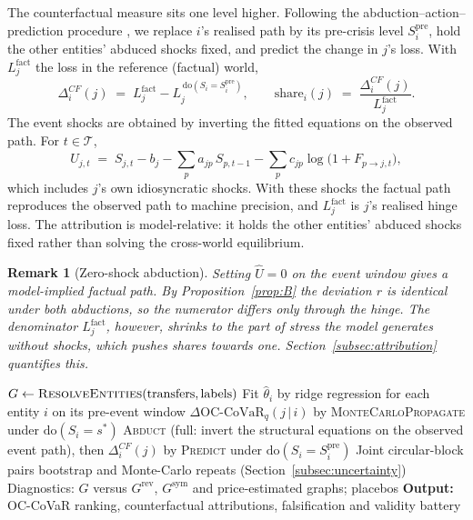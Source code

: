 \documentclass[referee,pdflatex,sn-mathphys-ay]{sn-jnl}
\theoremstyle{thmstyleone}%
\theoremstyle{thmstyletwo}%
\newtheorem{remark}{Remark}%
\theoremstyle{thmstylethree}%
\newcommand{\doop}{\mathrm{do}}
\newcommand{\OCCoVaR}{\text{OC-CoVaR}}
\begin{document}
The counterfactual measure sits one level higher. Following the abduction--action--prediction
procedure \citep{pearl2009causality,pearl2019seven}, we replace $i$'s realised path by its
pre-crisis level $S_i^{\mathrm{pre}}$, hold the other entities' abduced shocks fixed, and
predict the change in $j$'s loss. With $L_j^{\mathrm{fact}}$ the loss in the reference
(factual) world,
\begin{equation}
\label{eq:cf}
\Delta_i^{CF}(j) \;=\; L_j^{\mathrm{fact}} - L_j^{\,\doop(S_i=S_i^{\text{pre}})},
\qquad
\text{share}_i(j) \;=\; \frac{\Delta_i^{CF}(j)}{L_j^{\mathrm{fact}}}.
\end{equation}
The event shocks are obtained by inverting the fitted equations on the observed path. For
$t\in\mathcal{T}$,
\begin{equation}
\label{eq:abduct}
\hat U_{j,t} \;=\; S_{j,t}-b_j-\sum_{p} a_{jp}\,S_{p,t-1}-\sum_{p} c_{jp}\log\!\big(1+F_{p\to j,t}\big),
\end{equation}
which includes $j$'s own idiosyncratic shocks. With these shocks the factual path reproduces the
observed path to machine precision, and $L_j^{\mathrm{fact}}$ is $j$'s realised hinge loss.
The attribution is model-relative: it holds the other entities' abduced shocks fixed rather than
solving the cross-world equilibrium.

\begin{remark}[Zero-shock abduction]
Setting $\hat U=0$ on the event window gives a model-implied factual path. By Proposition~\ref{prop:B}
the deviation $r$ is identical under both abductions, so the numerator differs only through the
hinge. The denominator $L_j^{\mathrm{fact}}$, however, shrinks to the part of stress the model
generates without shocks, which pushes shares towards one. Section~\ref{subsec:attribution} quantifies this.
\end{remark}

\begin{algorithm}[tbp]
\caption{VEIN end-to-end pipeline}
\label{alg:vein}
\begin{algorithmic}[1]
\State $G \gets \textsc{ResolveEntities}(\text{transfers}, \text{labels})$ 
\State Fit $\hat\theta_i$ by ridge regression for each entity $i$ on its pre-event window
\State $\Delta\OCCoVaR_q(j\,|\,i)$ by \textsc{MonteCarloPropagate} under $\doop(S_i=s^\ast)$
\State \textsc{Abduct} (full: invert the structural equations on the observed event path), then $\Delta_i^{CF}(j)$ by \textsc{Predict} under $\doop(S_i=S_i^{\text{pre}})$
\State Joint circular-block pairs bootstrap and Monte-Carlo repeats (Section~\ref{subsec:uncertainty})
\State Diagnostics: $G$ versus $G^{\mathrm{rev}}$, $G^{\mathrm{sym}}$ and price-estimated graphs; placebos
\State \textbf{Output:} OC-CoVaR ranking, counterfactual attributions, falsification and validity battery
\end{algorithmic}
\end{algorithm}
\end{document}
